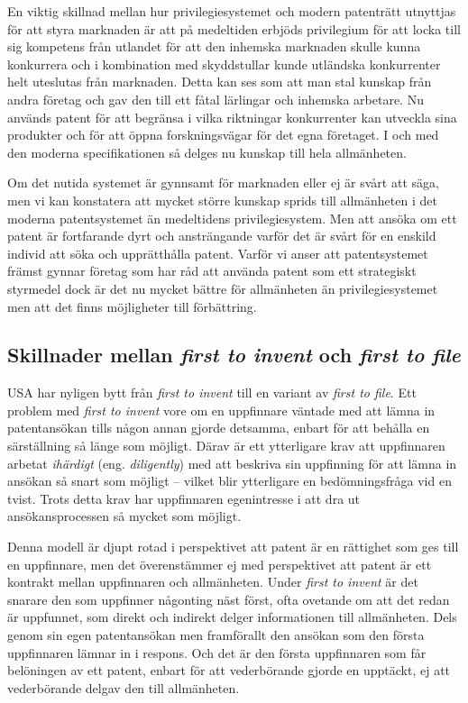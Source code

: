 En viktig skillnad mellan hur privilegiesystemet och modern patenträtt utnyttjas för att styra marknaden är att på medeltiden erbjöds privilegium för att locka till sig kompetens från utlandet för att den inhemska marknaden skulle kunna konkurrera och i kombination med skyddstullar kunde utländska konkurrenter helt uteslutas från marknaden. Detta kan ses som att man stal kunskap från andra företag och gav den till ett fåtal lärlingar och inhemska arbetare. Nu används patent för att begränsa i vilka riktningar konkurrenter kan utveckla sina produkter och för att öppna forskningsvägar för det egna företaget. I och med den moderna specifikationen så delges nu kunskap till hela allmänheten. 

Om det nutida systemet är gynnsamt för marknaden eller ej är svårt att säga, men vi kan konstatera att mycket större kunskap sprids till allmänheten i det moderna patentsystemet än medeltidens privilegiesystem. Men att ansöka om ett patent är fortfarande dyrt och ansträngande varför det är svårt för en enskild individ att söka och upprätthålla patent. Varför vi anser att patentsystemet främst gynnar företag som har råd att använda patent som ett strategiskt styrmedel dock är det nu mycket bättre för allmänheten än privilegiesystemet men att det finns möjligheter till förbättring.

\subsection{Skillnader mellan \emph{first to invent} och \emph{first to file}}

USA har nyligen bytt från \emph{first to invent} till en variant av \emph{first to file}. Ett problem med \emph{first to invent} vore om en uppfinnare väntade med att lämna in patentansökan tills någon annan gjorde detsamma, enbart för att behålla en särställning så länge som möjligt. Därav är ett ytterligare krav att uppfinnaren arbetat \emph{ihärdigt} (eng. \emph{diligently}) med att beskriva sin uppfinning för att lämna in ansökan så snart som möjligt\cite{cmu-overview} -- vilket blir ytterligare en bedömningsfråga vid en tvist\cite{cmu-overview}. Trots detta krav har uppfinnaren egenintresse i att dra ut ansökansprocessen så mycket som möjligt.

Denna modell är djupt rotad i perspektivet att patent är en rättighet som ges till en uppfinnare, men det överenstämmer ej med perspektivet att patent är ett kontrakt mellan uppfinnaren och allmänheten. Under \emph{first to invent} är det snarare den som uppfinner någonting näst först, ofta ovetande om att det redan är uppfunnet, som direkt och indirekt delger informationen till allmänheten. Dels genom sin egen patentansökan men framförallt den ansökan som den första uppfinnaren lämnar in i respons. Och det är den första uppfinnaren som får belöningen av ett patent, enbart för att vederbörande gjorde en upptäckt, ej att vederbörande delgav den till allmänheten.

